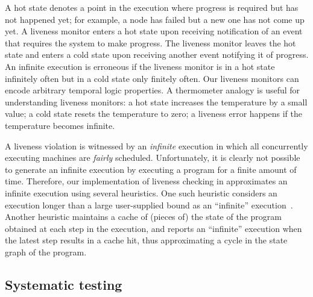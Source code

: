 A hot state denotes a point in the execution where progress is required but has not happened yet; for example, a node has failed but a new one has not come up yet. A liveness monitor enters a hot state upon receiving notification of an event that requires the system to make progress. The liveness monitor leaves the hot state and enters a cold state upon receiving another event notifying it of progress. An infinite execution is erroneous if the liveness monitor is in a hot state infinitely often but in a cold state only finitely often. Our liveness monitors can encode arbitrary temporal logic properties. A thermometer analogy is useful for understanding liveness monitors: a hot state increases the temperature by a small value; a cold state resets the temperature to zero; a liveness error happens if the temperature becomes infinite.

A liveness violation is witnessed by an \emph{infinite} execution in which all concurrently executing \psharp machines are \emph{fairly} scheduled. Unfortunately, it is clearly not possible to generate an infinite execution by executing a program for a finite amount of time. Therefore, our implementation of liveness checking in \psharp approximates an infinite execution using several heuristics. One such heuristic considers an execution longer than a large user-supplied bound as an ``infinite'' execution~\cite{killian2007life, musuvathi2008fair}. Another heuristic maintains a cache of (pieces of) the state of the \psharp program obtained at each step in the execution, and reports an ``infinite'' execution when the latest step results in a cache hit, thus approximating a cycle in the state graph of the program.


\subsection{Systematic testing}
\label{sec:psharp:testing}

